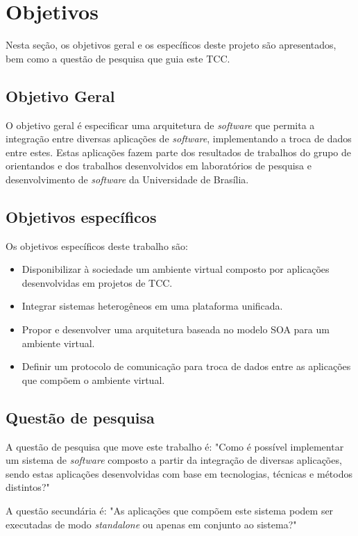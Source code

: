 \section{Objetivos}

Nesta seção, os objetivos geral e os específicos deste projeto são apresentados, bem como a questão de pesquisa que guia este TCC.

\subsection{Objetivo Geral}
O objetivo geral é especificar uma arquitetura de \textit{software} que permita a integração entre diversas aplicações de \textit{software}, implementando a troca de dados entre estes. Estas aplicações fazem parte dos resultados de trabalhos do grupo de orientandos e dos trabalhos desenvolvidos em laboratórios de pesquisa e desenvolvimento de \textit{software} da Universidade de Brasília.

\subsection{Objetivos específicos}
Os objetivos específicos deste trabalho são:
\begin{itemize}
\item Disponibilizar à sociedade um ambiente virtual composto por aplicações desenvolvidas em projetos de TCC.
\item Integrar sistemas heterogêneos em uma plataforma unificada.
\item Propor e desenvolver uma arquitetura baseada no modelo SOA para um ambiente virtual.
\item Definir um protocolo de comunicação para troca de dados entre as aplicações que compõem o ambiente virtual.
\end{itemize}

\subsection{Questão de pesquisa}
A questão de pesquisa que move este trabalho é: "Como é possível implementar um sistema de \textit{software} composto a partir da integração de diversas aplicações, sendo estas aplicações desenvolvidas com base em tecnologias, técnicas e métodos distintos?"

A questão secundária é: "As aplicações que compõem este sistema podem ser executadas de modo \textit{standalone} ou apenas em conjunto ao sistema?"


